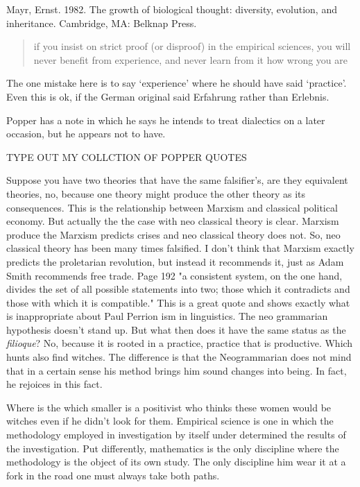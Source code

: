Mayr, Ernst. 1982. The growth of biological thought: diversity, evolution, and inheritance.
Cambridge, MA: Belknap Press.

\citep{Mayr1982}

\begin{quote}
    if you insist on strict proof (or disproof) in the empirical sciences, you will never benefit from experience, and never learn from it how wrong you are \citep[50]{Popper1959logic}
\end{quote}
The one mistake here is to say `experience' where he should have said `practice'. Even this is ok, if the German original said Erfahrung rather than Erlebnis. 

Popper has a note \citeyearpar[55, n. 3]{Popper1959logic} in which he says he intends to treat dialectics on a later occasion, but he appears not to have.

TYPE OUT MY COLLCTION OF POPPER QUOTES

Suppose you have two theories that have the same falsifier's, are they equivalent theories, no, because one theory might produce the other theory as its consequences. This is the relationship between Marxism and classical political economy. But actually the the case with neo classical theory is clear. Marxism produce the Marxism predicts crises and neo classical theory does not. So, neo classical theory has been many times falsified. I don't think that Marxism exactly predicts the proletarian revolution, but instead it recommends it, just as Adam Smith recommends free trade.
Page 192 "a consistent system, on the one hand, divides the set of all possible statements into two; those which it contradicts and those with which it is compatible." This is a great quote and shows exactly what is inappropriate about Paul Perrion ism in linguistics. The neo grammarian hypothesis doesn't stand up. But what then does it have the same status as the \textit{filioque}? 
No, because it is rooted in a practice, practice that is productive. Which hunts also find witches. The difference is that the Neogrammarian does not mind that in a certain sense his method brings him sound changes into being. In fact, he rejoices in this fact.

Where is the which smaller is a positivist who thinks these women would be witches even if he didn't look for them. Empirical science is one in which the methodology employed in investigation by itself under determined the results of the investigation. Put differently, mathematics is the only discipline where the methodology is the object of its own study. The only discipline him wear it at a fork in the road one must always take both paths.

